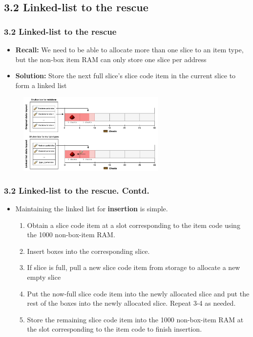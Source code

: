 \documentclass[aspectratio=169]{beamer}
\begin{document}
\subsection{3.2 Linked-list to the rescue}

\begin{frame}
	\frametitle{3.2 Linked-list to the rescue}

    \begin{itemize}
		\item \textbf{Recall:} We need to be able to allocate more than one slice to an item type, but the non-box item RAM can only store one slice per address
        \item \textbf{Solution:} Store the next full slice's slice code item in the current slice to form a linked list
	\end{itemize}
    \begin{figure}
        \includegraphics[width=0.65\textwidth]{linkedlistlayout.png}
    \end{figure}
\end{frame}


\begin{frame}
	\frametitle{3.2 Linked-list to the rescue. Contd.}

    \begin{itemize}
        \item Maintaining the linked list for \textbf{insertion} is simple.
        \begin{enumerate}
            \item Obtain a slice code item at a slot corresponding to the item code using the 1000 non-box-item RAM.
            \item Insert boxes into the corresponding slice.
            \item If slice is full, pull a new slice code item from storage to allocate a new empty slice
            \item Put the now-full slice code item into the newly allocated slice and put the rest of the boxes into the newly allocated slice. Repeat 3-4 as needed.
            \item Store the remaining slice code item into the 1000 non-box-item RAM at the slot corresponding to the item code to finish insertion.
        \end{enumerate}
    \end{itemize}
\end{frame}
\end{document}
